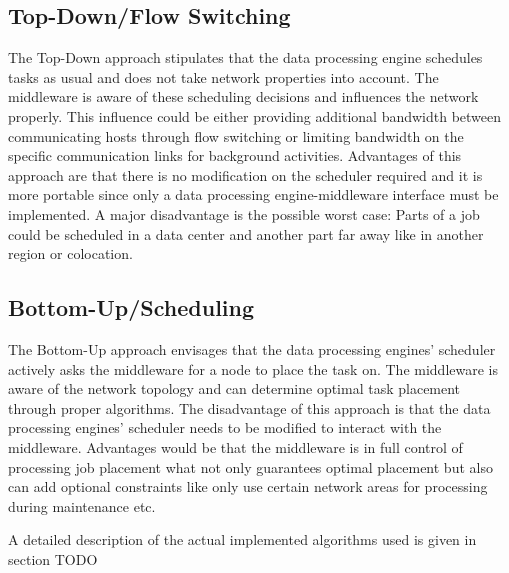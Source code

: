 \subsection{Top-Down/Flow Switching}
The Top-Down approach stipulates that the data processing engine schedules tasks as usual and does
not take network properties into account. The middleware is aware of these scheduling decisions and
influences the network properly. This influence could be either providing additional bandwidth
between communicating hosts through flow switching or limiting bandwidth on the specific
communication links for background activities. Advantages of this approach are that there is no
modification on the scheduler required and it is more portable since only a data processing
engine-middleware interface must be implemented. A major disadvantage is the possible worst case:
Parts of a job could be scheduled in a data center and another part far away like in another region
or colocation.

\subsection{Bottom-Up/Scheduling}
The Bottom-Up approach envisages that the data processing engines’ scheduler actively asks the
middleware for a node to place the task on. The middleware is aware of the network topology and can
determine optimal task placement through proper algorithms. The disadvantage of this approach is
that the data processing engines’ scheduler needs to be modified to interact with the middleware.
Advantages would be that the middleware is in full control of processing job placement what not only
guarantees optimal placement but also can add optional constraints like only use certain network
areas for processing during maintenance etc. 

A detailed description of the actual implemented algorithms used is given in section TODO
